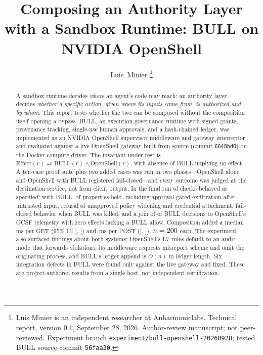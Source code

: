 \documentclass[journal]{IEEEtran}
\newcommand{\bull}{\textsc{BULL}}
\newcommand{\openshell}{OpenShell}
\newcommand{\expshort}{\texttt{56faa30}}
\newcommand{\osshort}{\texttt{6648bd0}}
\begin{document}
\title{Composing an Authority Layer with a Sandbox Runtime: \bull{} on NVIDIA \openshell}

\author{Luis~Minier%
\thanks{Luis Minier is an independent researcher at Anharmoniclabs. Technical report, version 0.1, September 28, 2026. Author-review manuscript; not peer-reviewed. Experiment branch \texttt{experiment/bull-openshell-20260928}; tested \bull{} source commit \expshort.}}

\maketitle

\begin{abstract}
A sandbox runtime decides \emph{where} an agent's code may reach; an authority layer decides \emph{whether a specific action, given where its inputs came from, is authorized and by whom}. This report tests whether the two can be composed without the composition itself opening a bypass. \bull{}, an execution-governance runtime with signed grants, provenance tracking, single-use human approvals, and a hash-chained ledger, was implemented as an NVIDIA \openshell{} supervisor middleware and gateway interceptor and evaluated against a live \openshell{} \osVersion{} gateway built from source (commit \osshort) on the Docker compute driver. The invariant under test is $\mathrm{Effect}(r) \Rightarrow \mathrm{BULL}(r) \wedge \mathrm{OpenShell}(r)$, with absence of \bull{} implying no effect. A ten-case proof suite plus two added cases was run in two phases---\openshell{} alone and \openshell{} with \bull{} registered fail-closed---and every outcome was judged at the destination service, not from client output. In the final run \passAll{} of \totalAll{} checks behaved as specified; with \bull{}, \passB{} of \totalB{} properties held, including approval-gated exfiltration after untrusted input, refusal of unapproved policy widening and credential attachment, fail-closed behavior when \bull{} was killed, and a join of \corrConsistent{} of \corrDecisions{} \bull{} decisions to \openshell{}'s OCSF telemetry with zero effects lacking a \bull{} allow. Composition added a median \deltaGet{}\,ms per GET (95\% CI [\ciLoGet, \ciHiGet]) and \deltaPost{}\,ms per POST ([\ciLoPost, \ciHiPost]), $n=200$ each. The experiment also surfaced findings about both systems: \openshell{}'s L7 rules default to an audit mode that forwards violations, its middleware requests misreport scheme and omit the originating process, and \bull{}'s ledger append is $O(n)$ in ledger length. Six integration defects in \bull{} were found only against the live gateway and fixed. These are project-authored results from a single host, not independent certification.
\end{abstract}
\end{document}
